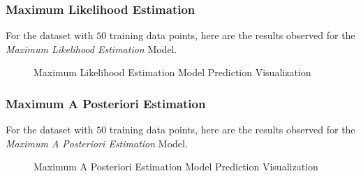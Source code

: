 \documentclass[12pt,twoside,a4paper]{article}
\begin{document}
\subsubsection*{Maximum Likelihood Estimation}
For the dataset with $50$ training data points, here are the results observed for the \textit{Maximum Likelihood Estimation} Model.
\begin{figure}[H]
    \centering
    \hspace{0mm}
    \hspace{0mm}
    \caption{Maximum Likelihood Estimation Model Prediction Visualization}
    \label{MLFIG}
\end{figure}

\pagebreak
\subsubsection*{Maximum A Posteriori Estimation}
For the dataset with $50$ training data points, here are the results observed for the \textit{Maximum A Posteriori Estimation} Model.
\begin{figure}[H]
    \centering
    \hspace{0mm}
    \hspace{0mm}
    \caption{Maximum A Posteriori Estimation Model Prediction Visualization}
    \label{MAPFIG}
\end{figure}

\end{document}
